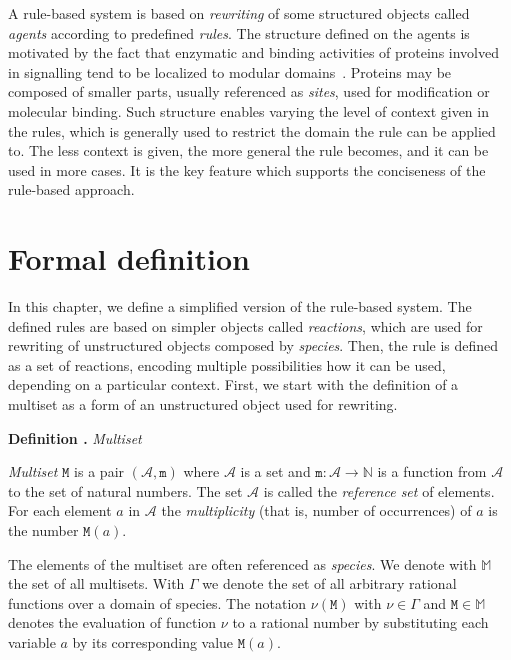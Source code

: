 \documentclass[11pt,a4paper]{report}
\newcounter{counter}[section]
\renewcommand{\thecounter}{\thechapter.\arabic{counter}}
\newenvironment{definition}[1]{\bigskip\refstepcounter{counter}\noindent\textbf{Definition \thecounter } \emph{#1} \par\nopagebreak\noindent \begin{itshape}}{\end{itshape}\bigskip}
\begin{document}
A rule-based system is based on \emph{rewriting} of some structured objects called \emph{agents} according to predefined \emph{rules}. The structure defined on the agents is motivated by the fact that enzymatic and binding activities of proteins involved in signalling tend to be localized to modular domains~\cite{pawson2003assembly}. Proteins may be composed of smaller parts, usually referenced as \emph{sites}, used for modification or molecular binding. Such structure enables varying the level of context given in the rules, which is generally used to restrict the domain the rule can be applied to. The less context is given, the more general the rule becomes, and it can be used in more cases. It is the key feature which supports the conciseness of the rule-based approach.

\section{Formal definition}

In this chapter, we define a simplified version of the rule-based system. The defined rules are based on simpler objects called \emph{reactions}, which are used for rewriting of unstructured objects composed by \emph{species}. Then, the rule is defined as a set of reactions, encoding multiple possibilities how it can be used, depending on a particular context. First, we start with the definition of a multiset as a form of an unstructured object used for rewriting.

\begin{definition}{Multiset}
\emph{Multiset} $\mathtt{M}$ is a pair $(\mathcal{A}, \mathtt{m})$ where $\mathcal{A}$ is a set and $ \mathtt{m} : \mathcal{A} \rightarrow \mathbb{N} $ is a function from $\mathcal{A}$ to the set of natural numbers. The set $\mathcal{A}$ is called the \emph{reference set} of elements. For each element $\mathit{a}$ in $\mathcal{A}$ the \emph{multiplicity} (that is, number of occurrences) of $\mathit{a}$ is the number $\mathtt{M}(\mathit{a})$.
\end{definition}

The elements of the multiset are often referenced as \emph{species}. We denote with $\mathbb{M}$ the set of all multisets. With $\Gamma$ we denote the set of all arbitrary rational functions over a domain of species. The notation $\nu(\mathtt{M})$ with $\nu \in \Gamma$ and $\mathtt{M} \in \mathbb{M}$ denotes the evaluation of function $\nu$ to a rational number by substituting each variable $\mathit{a}$ by its corresponding value $\mathtt{M}(\mathit{a})$.
\end{document}

